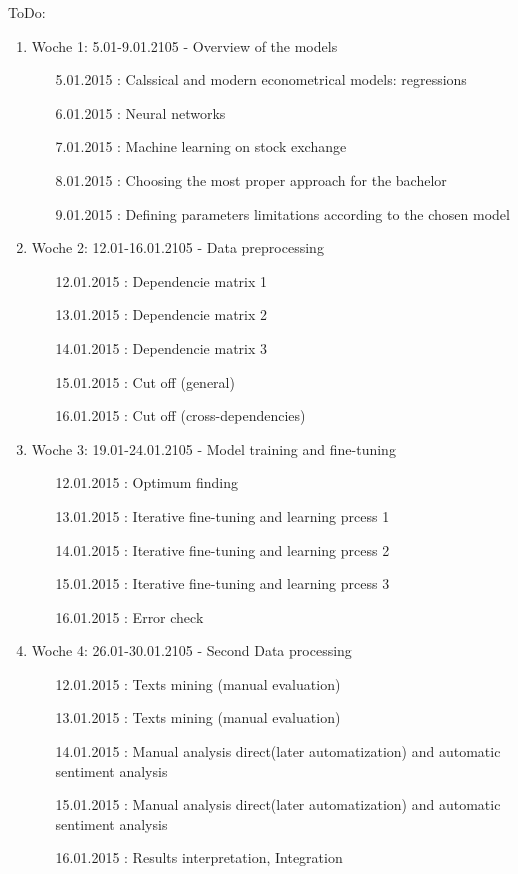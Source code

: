 \documentclass {article}
\begin{document}
ToDo:
\begin{enumerate}
	\item Woche 1: 5.01-9.01.2105 - Overview of the models 
	\begin{enumerate}
		\item[5.01.2015]: Calssical and modern econometrical models: regressions
		\item[6.01.2015]: Neural networks
		\item[7.01.2015]: Machine learning on stock exchange
		\item[8.01.2015]: Choosing the most proper approach for the bachelor
		\item[9.01.2015]: Defining parameters limitations according to the chosen model	
	\end{enumerate}
	\item Woche 2: 12.01-16.01.2105 - Data preprocessing
	\begin{enumerate}
		\item[12.01.2015]: Dependencie matrix 1
		\item[13.01.2015]: Dependencie matrix 2
		\item[14.01.2015]: Dependencie matrix 3
		\item[15.01.2015]: Cut off (general)
		\item[16.01.2015]: Cut off (cross-dependencies)
	\end{enumerate}
	\item Woche 3: 19.01-24.01.2105 - Model training and fine-tuning
	\begin{enumerate}
		\item[12.01.2015]: Optimum finding
		\item[13.01.2015]: Iterative fine-tuning and learning prcess 1
		\item[14.01.2015]: Iterative fine-tuning and learning prcess 2
		\item[15.01.2015]: Iterative fine-tuning and learning prcess 3
		\item[16.01.2015]: Error check
	\end{enumerate}
	\item Woche 4: 26.01-30.01.2105 - Second Data processing
	\begin{enumerate}
		\item[12.01.2015]: Texts mining (manual evaluation) 
		\item[13.01.2015]: Texts mining (manual evaluation)
		\item[14.01.2015]: Manual analysis direct(later automatization) and automatic sentiment analysis
		\item[15.01.2015]: Manual analysis direct(later automatization) and automatic sentiment analysis
		\item[16.01.2015]: Results interpretation, Integration 
	\end{enumerate}
\end{enumerate}
\end{document}

